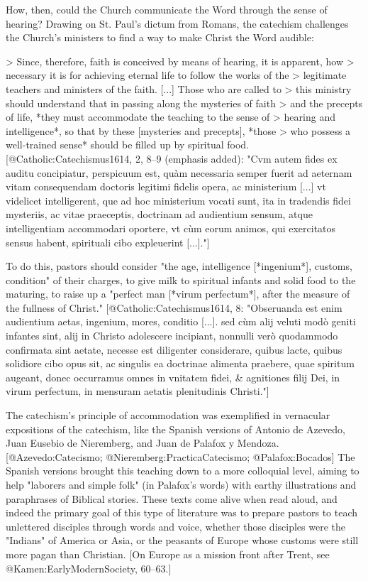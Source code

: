 How, then, could the Church communicate the Word through the sense of hearing?
Drawing on St. Paul's dictum from Romans, the catechism challenges the Church's
ministers to find a way to make Christ the Word audible:

> Since, therefore, faith is conceived by means of hearing, it is apparent, how
> necessary it is for achieving eternal life to follow the works of the
> legitimate teachers and ministers of the faith. [...] Those who are called to
> this ministry should understand that in passing along the mysteries of faith
> and the precepts of life, *they must accommodate the teaching to the sense of
> hearing and intelligence*, so that by these [mysteries and precepts], *those
> who possess a well-trained sense* should be filled up by spiritual food.
[@Catholic:Catechismus1614, 2, 8--9 (emphasis added): 
"Cvm autem fides ex auditu concipiatur, perspicuum est, quàm necessaria semper
fuerit ad aeternam vitam consequendam doctoris legitimi fidelis opera, ac
ministerium [...] vt videlicet intelligerent, que ad hoc ministerium vocati
sunt, ita in tradendis fidei mysteriis, ac vitae praeceptis, doctrinam ad
audientium sensum, atque intelligentiam accommodari oportere, vt cùm eorum
animos, qui exercitatos sensus habent, spirituali cibo expleuerint [...]."]

To do this, pastors should consider "the age, intelligence [*ingenium*],
customs, condition" of their charges, to give milk to spiritual infants and
solid food to the maturing, to raise up a "perfect man [*virum perfectum*],
after the measure of the fullness of Christ." 
[@Catholic:Catechismus1614, 8:
"Obseruanda est enim audientium aetas, ingenium, mores, conditio [...]. sed cùm
alij veluti modò geniti infantes sint, alij in Christo adolescere incipiant,
nonnulli verò quodammodo confirmata sint aetate, necesse est diligenter
considerare, quibus lacte, quibus solidiore cibo opus sit, ac singulis ea
doctrinae alimenta praebere, quae spiritum augeant, donec occurramus omnes in
vnitatem fidei, & agnitiones filij Dei, in virum perfectum, in mensuram aetatis
plenitudinis Christi."]

The catechism's principle of accommodation was exemplified in vernacular
expositions of the catechism, like the Spanish versions of Antonio de Azevedo,
Juan Eusebio de Nieremberg, and Juan de Palafox y Mendoza. 
[@Azevedo:Catecismo; @Nieremberg:PracticaCatecismo; @Palafox:Bocados]
The Spanish versions brought this teaching down to a more colloquial level,
aiming to help "laborers and simple folk" (in Palafox's words) with earthy
illustrations and paraphrases of Biblical stories.
These texts come alive when read aloud, and indeed the primary goal of this type
of literature was to prepare pastors to teach unlettered disciples through words
and voice, whether those disciples were the "Indians" of America or Asia, or the
peasants of Europe whose customs were still more pagan than Christian. 
[On Europe as a mission front after Trent, see @Kamen:EarlyModernSociety,
60--63.]

